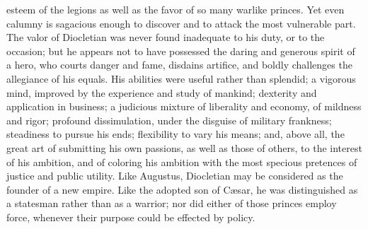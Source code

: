 esteem of the legions as well as the favor of so many warlike
princes. Yet even calumny is sagacious enough to discover and to
attack the most vulnerable part. The valor of Diocletian was
never found inadequate to his duty, or to the occasion; but he
appears not to have possessed the daring and generous spirit of a
hero, who courts danger and fame, disdains artifice, and boldly
challenges the allegiance of his equals. His abilities were
useful rather than splendid; a vigorous mind, improved by the
experience and study of mankind; dexterity and application in
business; a judicious mixture of liberality and economy, of
mildness and rigor; profound dissimulation, under the disguise of
military frankness; steadiness to pursue his ends; flexibility to
vary his means; and, above all, the great art of submitting his
own passions, as well as those of others, to the interest of his
ambition, and of coloring his ambition with the most specious
pretences of justice and public utility. Like Augustus,
Diocletian may be considered as the founder of a new empire. Like
the adopted son of Cæsar, he was distinguished as a statesman
rather than as a warrior; nor did either of those princes employ
force, whenever their purpose could be effected by policy.




